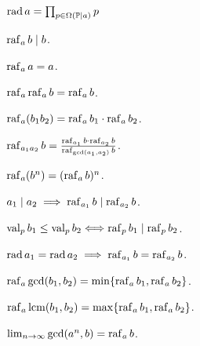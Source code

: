\begin{proposition}
    $\operatorname{rad} a = \prod_{p \in \Omega(\mathbb{P}\mid a)}p$
\end{proposition}
\begin{proposition}\label{prop:self-containment}
    $\operatorname{raf}_{a}b \mid b$.
\end{proposition}
\begin{proposition}
    $\operatorname{raf}_{a}a = a$.
\end{proposition}
\begin{proposition}\label{prop:raf-idempotency}
    $\operatorname{raf}_{a}\operatorname{raf}_{a}b = \operatorname{raf}_{a}b$.
\end{proposition}
\begin{proposition}\label{prop:raf-completely-multiplicative}
    $\operatorname{raf}_{a}(b_1b_2) = \operatorname{raf}_{a}b_1\cdot\operatorname{raf}_{a}b_2$.
\end{proposition}
\begin{proposition}\label{prop:raf-inclusion-exclusion-principle}
    $\operatorname{raf}_{a_1 a_2}b = \frac{\operatorname{raf}_{a_1}b \cdot \operatorname{raf}_{a_2}b}{\operatorname{raf}_{\gcd(a_1, a_2)}b}$.
\end{proposition}
\begin{proposition}\label{prop:raf-power-homogeneity}
    $\operatorname{raf}_{a}(b^n) = (\operatorname{raf}_{a}b)^{n}$.
\end{proposition}
\begin{proposition}\label{prop:raf-index-monotonicity}
    $a_1 \mid a_2 \implies \operatorname{raf}_{a_1}b \mid \operatorname{raf}_{a_2}b$.
\end{proposition}
\begin{proposition}\label{prop:raf-valuation-monotonicity}
    $\operatorname{val}_{p}b_1 \le \operatorname{val}_{p}b_2 \Longleftrightarrow \operatorname{raf}_{p}b_1 \mid \operatorname{raf}_{p}b_2$.
\end{proposition}
\begin{proposition}\label{prop:raf-radical-invariance}
    $\operatorname{rad} a_1 = \operatorname{rad} a_2 \implies \operatorname{raf}_{a_1}b = \operatorname{raf}_{a_2}b$.
\end{proposition}
\begin{proposition}\label{prop:raf-gcd-distributivity}
    $\operatorname{raf}_{a}\gcd(b_1, b_2) = \min\{\operatorname{raf}_{a}b_1, \operatorname{raf}_{a}b_2\}$.
\end{proposition}
\begin{proposition}\label{prop:raf-lcm-distributivity}
    $\operatorname{raf}_{a}\operatorname*{lcm}(b_1, b_2) = \max\{\operatorname{raf}_{a}b_1, \operatorname{raf}_{a}b_2\}$.
\end{proposition}
\begin{proposition}\label{prop:raf-limit-power-gcd-raf-equvalent}
    $\lim_{n\to\infty}\gcd(a^{n}, b) = \operatorname{raf}_{a}b$.
\end{proposition}
